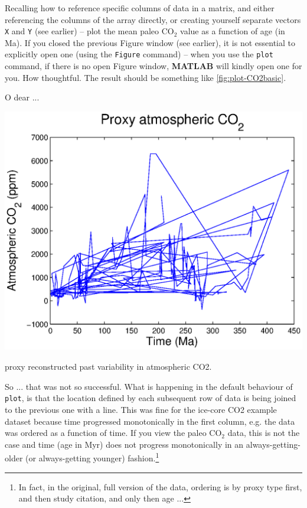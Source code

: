 \documentclass{tufte-book} %
\begin{document}
Recalling how to reference specific columns of data in a matrix, and either referencing the columns of the array directly, or creating yourself separate vectors \texttt{X} and \texttt{Y} (see earlier) -- plot the mean paleo CO\(_{2}\) value as a function of age (in Ma). If you  closed the previous \textsf{Figure} window (see earlier), it is not essential to explicitly open one (using the \texttt{Figure} command) -- when you use the \texttt{plot} command, if there is no open \textsf{Figure} window, \textbf{MATLAB} will kindly open one for you. How thoughtful. The result should be something like \ref{fig:plot-CO2basic}.

O dear ...

\begin{marginfigure}[0.0in]
\includegraphics[width=\linewidth]{plot-CO2basic.eps}
\caption{proxy reconstructed past variability in atmospheric CO2.}
\label{fig:plot-CO2basic}
\end{marginfigure}

So ... that was not so successful. What is happening in the default behaviour of \texttt{plot}, is that the location defined by each subsequent row of data is being joined to the previous one with a line. This was fine for the ice-core CO2 example dataset because time progressed monotonically  in the first column, e.g. the data was ordered as a function of time. If you view the paleo CO\(_{2}\) data, this is not the case and time (age in Myr) does not progress monotonically in an always-getting-older (or always-getting younger) fashion.\footnote{In fact, in the original, full version of the data, ordering is by proxy type first, and then study citation, and only then age ...}
\end{document}
